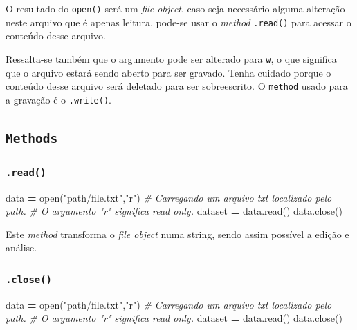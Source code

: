 \documentclass[]{book}
\newenvironment{Shaded}{\begin{snugshade}}{\end{snugshade}}
\newcommand{\StringTok}[1]{\textcolor[rgb]{0.31,0.60,0.02}{#1}}
\newcommand{\CommentTok}[1]{\textcolor[rgb]{0.56,0.35,0.01}{\textit{#1}}}
\newcommand{\OperatorTok}[1]{\textcolor[rgb]{0.81,0.36,0.00}{\textbf{#1}}}
\newcommand{\BuiltInTok}[1]{#1}
\newcommand{\NormalTok}[1]{#1}
\begin{document}
O resultado do \texttt{open()} será um \emph{file object}, caso seja
necessário alguma alteração neste arquivo que é apenas leitura, pode-se
usar o \emph{method} \texttt{.read()} para acessar o conteúdo desse
arquivo.

Ressalta-se também que o argumento pode ser alterado para \texttt{w}, o
que significa que o arquivo estará sendo aberto para ser gravado. Tenha
cuidado porque o conteúdo desse arquivo será deletado para ser
sobreescrito. O \texttt{method} usado para a gravação é o
\texttt{.write()}.

\subsection{\texorpdfstring{\texttt{Methods}}{Methods}}\label{methods-2}

\subsubsection{\texorpdfstring{\texttt{.read()}}{.read()}}\label{read}

\begin{Shaded}
\begin{Highlighting}[]
\NormalTok{data }\OperatorTok{=} \BuiltInTok{open}\NormalTok{(}\StringTok{"path/file.txt"}\NormalTok{,}\StringTok{"r"}\NormalTok{)  }\CommentTok{# Carregando um arquivo txt localizado pelo path.}
                                  \CommentTok{# O argumento "r" significa read only.}
\NormalTok{dataset }\OperatorTok{=}\NormalTok{ data.read()}
\NormalTok{data.close()}
\end{Highlighting}
\end{Shaded}

Este \emph{method} transforma o \emph{file object} numa string, sendo
assim possível a edição e análise.

\subsubsection{\texorpdfstring{\texttt{.close()}}{.close()}}\label{close}

\begin{Shaded}
\begin{Highlighting}[]
\NormalTok{data }\OperatorTok{=} \BuiltInTok{open}\NormalTok{(}\StringTok{"path/file.txt"}\NormalTok{,}\StringTok{"r"}\NormalTok{)  }\CommentTok{# Carregando um arquivo txt localizado pelo path.}
                                  \CommentTok{# O argumento "r" significa read only.}
\NormalTok{dataset }\OperatorTok{=}\NormalTok{ data.read()}
\NormalTok{data.close()}
\end{Highlighting}
\end{Shaded}
\end{document}
